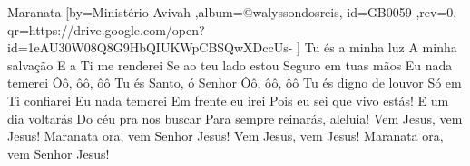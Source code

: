 \beginsong
{Maranata %
}[by={Ministério Avivah %
},album={@walyssondosreis},
id={GB0059 %
},rev={0}, %
qr={https://drive.google.com/open?id=1eAU30W08Q8G9HbQIUKWpCBSQwXDccUs- %
}]
\beginverse*
Tu és a minha luz
A minha salvação
E a Ti me renderei
Se ao teu lado estou
Seguro em tuas mãos
Eu nada temerei
\endverse
\beginverse*
Ôô, ôô, ôô
Tu és Santo, ó Senhor
Ôô, ôô, ôô
Tu és digno de louvor
\endverse
\beginchorus
Só em Ti confiarei
Eu nada temerei
Em frente eu irei
Pois eu sei que vivo estás!
E um dia voltarás
Do céu pra nos buscar
Para sempre reinarás, aleluia!
\endchorus
\beginverse*
Vem Jesus, vem Jesus!
Maranata ora, vem Senhor Jesus!
Vem Jesus, vem Jesus!
Maranata ora, vem Senhor Jesus!
\endverse

